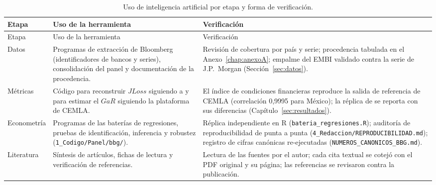 \begin{small}
\begin{longtable}{>{\raggedright\arraybackslash}p{}>{\raggedright\arraybackslash}p{}>{\raggedright\arraybackslash}p{}}
\caption[Uso de inteligencia artificial por etapa]{Uso de inteligencia artificial por etapa y forma de verificación.}\label{tab:ia-etapas}\\
\toprule
Etapa & Uso de la herramienta & Verificación \\
\midrule
\endfirsthead
\toprule
Etapa & Uso de la herramienta & Verificación \\
\midrule
\endhead
\bottomrule
\endfoot
Datos & Programas de extracción de Bloomberg (identificadores de bancos y series), consolidación del panel y documentación de la procedencia. & Revisión de cobertura por país y serie; procedencia tabulada en el Anexo~\ref{chap:anexoA}; empalme del EMBI validado contra la serie de J.P.\ Morgan (Sección~\ref{sec:datos}). \\
Métricas & Código para reconstruir $JLoss$ siguiendo a \citet{Chari2024b} y para estimar el $GaR$ siguiendo la plataforma de CEMLA. & El índice de condiciones financieras reproduce la salida de referencia de CEMLA (correlación 0,9995 para México); la réplica de \citet{Chari2024b} se reporta con sus diferencias (Capítulo~\ref{sec:resultados}). \\
Econometría & Programas de las baterías de regresiones, pruebas de identificación, inferencia y robustez (\texttt{1\_Codigo/Panel/bbg/}). & Réplica independiente en R (\texttt{bateria\_regresiones.R}); auditoría de reproducibilidad de punta a punta (\texttt{4\_Redaccion/}\allowbreak\texttt{REPRODUCIBILIDAD.md}); registro de cifras canónicas re-ejecutadas (\texttt{NUMEROS\_}\allowbreak\texttt{CANONICOS\_BBG.md}). \\
Literatura & Síntesis de artículos, fichas de lectura y verificación de referencias. & Lectura de las fuentes por el autor; cada cita textual se cotejó con el PDF original y su página; las referencias se revisaron contra la publicación. \\

\end{longtable}
\end{small}
